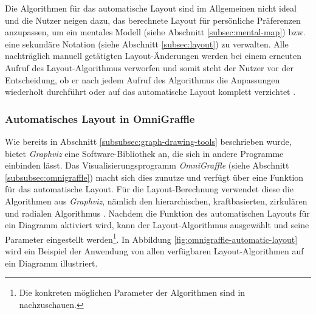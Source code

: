 Die Algorithmen für das automatische Layout sind im Allgemeinen nicht ideal und die Nutzer neigen dazu, das berechnete Layout für persönliche Präferenzen anzupassen, um ein mentales Modell (siehe Abschnitt \ref{subsec:mental-map}) bzw. eine sekundäre Notation (siehe Abschnitt \ref{subsec:layout}) zu verwalten. Alle nachträglich manuell getätigten Layout-Änderungen werden bei einem erneuten Aufruf des Layout-Algorithmus verworfen und somit steht der Nutzer vor der Entscheidung, ob er nach jedem Aufruf des Algorithmus die Anpassungen wiederholt durchführt oder auf das automatische Layout komplett verzichtet \cite[S.119ff]{Eiglsperger04Automatic}.

\subsubsection{Automatisches Layout in OmniGraffle}
\label{subsubsec:omnigraffle-auto-layout}

Wie bereits in Abschnitt \ref{subsubsec:graph-drawing-tools} beschrieben wurde, bietet \textit{Graphviz} eine Software-Bibliothek an, die sich in andere Programme einbinden lässt. Das Visualisierungsprogramm \textit{OmniGraffle} (siehe Abschnitt \ref{subsubsec:omnigraffle}) macht sich dies zunutze und verfügt über eine Funktion für das automatische Layout. Für die Layout-Berechnung verwendet diese die Algorithmen aus \textit{Graphviz}, nämlich den hierarchischen, kraftbasierten, zirkulären und radialen Algorithmus \cite{Olsen10OmniGraffle}. Nachdem die Funktion des automatischen Layouts für ein Diagramm aktiviert wird, kann der Layout-Algorithmus ausgewählt und seine Parameter eingestellt werden\footnote{Die konkreten möglichen Parameter der Algorithmen sind in \cite[S.74]{08OmniGraffle} nachzuschauen.}. In Abbildung \ref{fig:omnigraffle-automatic-layout} wird ein Beispiel der Anwendung von allen verfügbaren Layout-Algorithmen auf ein Diagramm illustriert.

